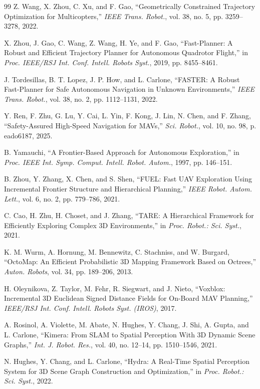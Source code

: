 \documentclass[letterpaper,10pt,conference]{ieeeconf}
\begin{document}
{\begin{thebibliography}{99}
Z. Wang, X. Zhou, C. Xu, and F. Gao,
``Geometrically Constrained Trajectory Optimization for Multicopters,''
\emph{IEEE Trans. Robot.}, vol. 38, no. 5, pp. 3259--3278, 2022.

X. Zhou, J. Gao, C. Wang, Z. Wang, H. Ye, and F. Gao,
``Fast-Planner: A Robust and Efficient Trajectory Planner for Autonomous
Quadrotor Flight,'' in \emph{Proc. IEEE/RSJ Int. Conf. Intell. Robots Syst.},
2019, pp. 8455--8461.

J. Tordesillas, B. T. Lopez, J. P. How, and L. Carlone,
``FASTER: A Robust Fast-Planner for Safe Autonomous Navigation in Unknown
Environments,'' \emph{IEEE Trans. Robot.}, vol. 38, no. 2, pp. 1112--1131,
2022.

Y. Ren, F. Zhu, G. Lu, Y. Cai, L. Yin, F. Kong, J. Lin, N. Chen, and
F. Zhang,
``Safety-Assured High-Speed Navigation for MAVs,''
\emph{Sci. Robot.}, vol. 10, no. 98, p. eado6187, 2025.

B. Yamauchi,
``A Frontier-Based Approach for Autonomous Exploration,'' in \emph{Proc.
IEEE Int. Symp. Comput. Intell. Robot. Autom.}, 1997, pp. 146--151.

B. Zhou, Y. Zhang, X. Chen, and S. Shen,
``FUEL: Fast UAV Exploration Using Incremental Frontier Structure and
Hierarchical Planning,'' \emph{IEEE Robot. Autom. Lett.}, vol. 6, no. 2,
pp. 779--786, 2021.

C. Cao, H. Zhu, H. Choset, and J. Zhang,
``TARE: A Hierarchical Framework for Efficiently Exploring Complex 3D
Environments,'' in \emph{Proc. Robot.: Sci. Syst.}, 2021.

K. M. Wurm, A. Hornung, M. Bennewitz, C. Stachniss, and W. Burgard,
``OctoMap: An Efficient Probabilistic 3D Mapping Framework Based on
Octrees,'' \emph{Auton. Robots}, vol. 34, pp. 189--206, 2013.

H. Oleynikova, Z. Taylor, M. Fehr, R. Siegwart, and J. Nieto,
``Voxblox: Incremental 3D Euclidean Signed Distance Fields for On-Board MAV
Planning,'' \emph{IEEE/RSJ Int. Conf. Intell. Robots Syst. (IROS)}, 2017.

A. Rosinol, A. Violette, M. Abate, N. Hughes, Y. Chang, J. Shi, A. Gupta, and
L. Carlone,
``Kimera: From SLAM to Spatial Perception With 3D Dynamic Scene Graphs,''
\emph{Int. J. Robot. Res.}, vol. 40, no. 12--14, pp. 1510--1546, 2021.

N. Hughes, Y. Chang, and L. Carlone,
``Hydra: A Real-Time Spatial Perception System for 3D Scene Graph
Construction and Optimization,'' in \emph{Proc. Robot.: Sci. Syst.}, 2022.


\end{thebibliography}}
\end{document}
